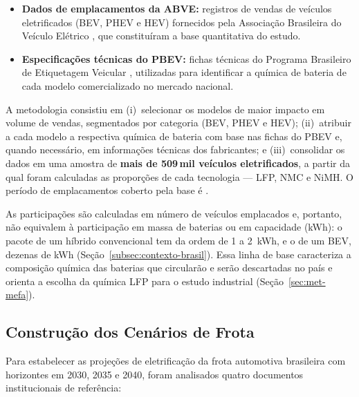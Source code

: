\begin{itemize}
    \item \textbf{Dados de emplacamentos da ABVE:} registros de vendas de veículos
    eletrificados (BEV, PHEV e HEV) fornecidos pela Associação Brasileira do
    Veículo Elétrico \cite{ABVE}, que constituíram a base quantitativa do estudo.

    \item \textbf{Especificações técnicas do PBEV:} fichas técnicas do Programa
    Brasileiro de Etiquetagem Veicular \cite{PBEV}, utilizadas para identificar
    a química de bateria de cada modelo comercializado no mercado nacional.
\end{itemize}

A metodologia consistiu em (i)~selecionar os modelos de maior impacto em volume de
vendas, segmentados por categoria (BEV, PHEV e HEV); (ii)~atribuir a cada modelo a
respectiva química de bateria com base nas fichas do PBEV e, quando necessário, em
informações técnicas dos fabricantes; e (iii)~consolidar os dados em uma amostra
de \textbf{mais de 509\,mil veículos eletrificados}, a partir da qual foram
calculadas as proporções de cada tecnologia — LFP, NMC e NiMH. O período de
emplacamentos coberto pela base é
.

As participações são calculadas em número de veículos emplacados e, portanto,
não equivalem à participação em massa de baterias ou em capacidade (kWh): o
pacote de um híbrido convencional tem da ordem de 1 a 2~kWh, e o de um BEV,
dezenas de kWh (Seção~\ref{subsec:contexto-brasil}). Essa linha de base
caracteriza a composição química das baterias que circularão e serão
descartadas no país e orienta a escolha da química LFP para o estudo industrial
(Seção~\ref{sec:met-mefa}).

\subsection{Construção dos Cenários de Frota}
\label{sec:met-cenarios}

Para estabelecer as projeções de eletrificação da frota automotiva brasileira com
horizontes em 2030, 2035 e 2040, foram analisados quatro documentos institucionais
de referência:

